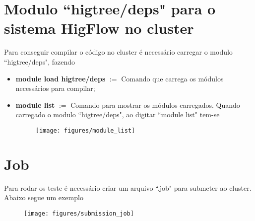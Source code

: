 \documentclass[12pt]{article}
\begin{document}
\section{Modulo ``higtree/deps" para o sistema HigFlow no cluster}

Para conseguir compilar o código no cluster é necessário carregar o modulo ``higtree/deps", fazendo
\begin{itemize}
	\item \textbf{module load higtree/deps} $:=$ Comando que carrega os módulos necessários para compilar;
	\item \textbf{module list} $:=$ Comando para mostrar os módulos carregados. Quando carregado o modulo ``higtree/deps", ao digitar ``module list" tem-se
	\begin{figure}[htb]
		\centering
		\texttt{[image: figures/module\_list]}
		\label{fig:fig02}
	\end{figure}
\end{itemize}

\section{Job}\label{sec:job_fun}

Para rodar os teste é necessário criar um arquivo ``.job" para submeter ao cluster. Abaixo segue um exemplo
\begin{figure}[htb]
	\centering
	\texttt{[image: figures/submission\_job]}
	\label{fig:fig03}
\end{figure}


%
%
\end{document}
